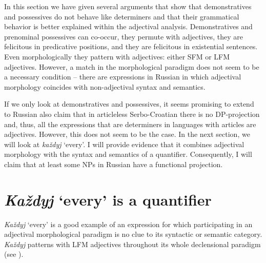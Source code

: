\documentclass[output=paper,
colorlinks,
citecolor=brown,
newtxmath
]{langscibook}
\begin{document}
In this section we have given several arguments that show that demonstratives and possessives do not behave like determiners and that their grammatical behavior is better explained within the adjectival analysis. Demonstratives and prenominal possessives can co-occur, they permute with adjectives, they are felicitous in predicative positions, and they are felicitous in existential sentences. Even morphologically they pattern with adjectives: either SFM or LFM adjectives. However, a match in the morphological paradigm does not seem to be a necessary condition -- there are expressions in Russian in which adjectival morphology coincides with non-adjectival syntax and semantics.

If we only look at demonstratives and possessives, it seems promising to extend to Russian also   claim that in articleless Serbo-Croatian there is no DP-projection and, thus, all the expressions that are determiners in languages with articles are adjectives. 
However, this does not seem to be the case. In the next section, we will look at \textit{každyj} `every'. I will provide evidence that it combines adjectival morphology with the syntax and semantics of a quantifier. Consequently, I will claim that at least some NPs in Russian have a functional projection.
%
%
\section{\textit{Každyj} `every' is a quantifier}\label{sec:3_kazdyj}

\textit{Každyj} `every' is a good example of an expression for which participating in an adjectival morphological paradigm is no clue to its syntactic or semantic category. \textit{Každyj} patterns with LFM adjectives throughout its whole declensional paradigm (see ).
\end{document}
